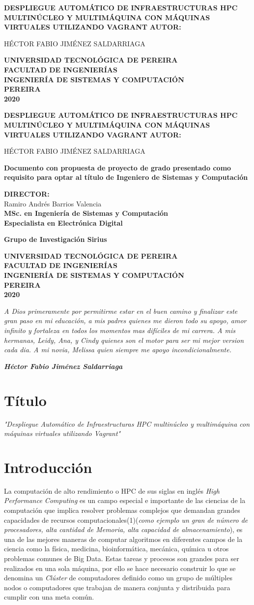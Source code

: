 \documentclass[letterpaper, 12pt, oneside]{article}
\newcommand\portada{
    \begin{titlepage}
		\begin{center}
			{\large \bf DESPLIEGUE AUTOMÁTICO DE INFRAESTRUCTURAS HPC MULTINÚCLEO Y MULTIMÁQUINA CON MÁQUINAS VIRTUALES UTILIZANDO VAGRANT }
			\vfill
  			{\large\bf AUTOR:} \\
			{\large HÉCTOR FABIO JIMÉNEZ SALDARRIAGA \par}
			\vfill
			{\large\bf UNIVERSIDAD TECNOLÓGICA DE PEREIRA} \\
			{\large\bf FACULTAD DE INGENIERÍAS} \\
			{\large\bf INGENIERÍA DE SISTEMAS Y COMPUTACIÓN} \\
			{\large\bf PEREIRA} \\
			{\large\bf 2020}
		\end{center}
	\end{titlepage}
}
\newcommand\contraportada{
\begin{titlepage}
		\begin{center}
			{\large \bf DESPLIEGUE AUTOMÁTICO DE INFRAESTRUCTURAS HPC MULTINÚCLEO Y MULTIMÁQUINA CON MÁQUINAS VIRTUALES UTILIZANDO VAGRANT }
			\vfill
			{\large\bf AUTOR:} \\
			{\large HÉCTOR FABIO JIMÉNEZ SALDARRIAGA\par}
			\vfill
			{\large\bf Documento con propuesta de proyecto de grado presentado como requisito para optar al título de Ingeniero de Sistemas y Computación\par}
			\vfill
			{\large\bf DIRECTOR:} \\
			{\large Ramiro Andrés Barrios Valencia} \\
			{\large\bf MSc. en Ingeniería de Sistemas y Computación} \\
			{\large\bf Especialista en Electrónica Digital} \\
			{\large\bf Grupo de Investigación Sirius\par}
			\vfill
			{\large\bf UNIVERSIDAD TECNOLÓGICA DE PEREIRA} \\
			{\large\bf FACULTAD DE INGENIERÍAS} \\
			{\large\bf INGENIERÍA DE SISTEMAS Y COMPUTACIÓN} \\
			{\large\bf PEREIRA} \\
			{\large\bf 2020}
		\end{center}
	\end{titlepage}
}
\begin{document}
\portada
\contraportada
\newpage
	\clearpage
    \begin{center}
    \thispagestyle{empty}
    \vspace*{\fill}
    \textit{A Dios primeramente por permitirme estar en el buen camino y finalizar este gran paso en mi educación, a mis padres quienes me dieron todo su apoyo, amor infinito y fortaleza en todos los momentos mas difíciles de mi carrera. A mis hermanas, Leidy, Ana, y Cindy quienes son el motor para ser mi mejor version cada dia. A mi novia, Melissa quien siempre me apoyo incondicionalmente.}
    \begin{flushright}
    \textit{\textbf{Héctor Fabio Jiménez Saldarriaga}}
    \end{flushright}
    
    \vspace*{\fill}
    \end{center}
\clearpage
\newpage
	\renewcommand{\tablename}{Tabla}
	\renewcommand{\contentsname}{\centering Contenido}
	\tableofcontents
	\newpage
	\renewcommand{\listfigurename}{Lista de Figuras}
    \listoffigures
    \newpage
    \renewcommand{\listtablename}{Lista de Tablas }
    \listoftables
	\clearpage
	
	\section{Título}
	\textit{"Despliegue Automático de Infraestructuras HPC multinúcleo y multimáquina con máquinas virtuales utilizando Vagrant"}

	\section{Introducción}
	
	La computación de alto rendimiento o HPC de sus siglas en inglés \textit{High Performance Computing} es un campo especial e importante de las ciencias de la computación que implica resolver problemas complejos que demandan grandes capacidades de recursos computacionales(1)(\textit{como ejemplo un gran de número de procesadores, alta cantidad de Memoria, alta capacidad de almacenamiento}), es una de las mejores maneras de computar algoritmos en diferentes campos de la ciencia como la física, medicina, bioinformática,  mecánica, química u otros problemas comunes de Big Data. Estas tareas y procesos son  grandes para ser realizados en una sola máquina, por ello se hace necesario construir lo que se denomina un \textit{Clúster} de computadores definido como un grupo de múltiples nodos o computadores que trabajan de manera conjunta y distribuida para cumplir con una meta común. 
	
\end{document}
